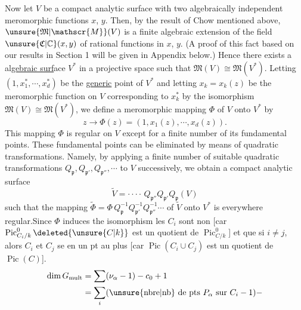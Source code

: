 Now let $V$ be a compact analytic surface with two algebraically independent meromorphic functions $x$, $y$. Then, by the result of Chow mentioned above, $\unsure{\mathfrak{M}|\mathscr{M}}(V)$ is a finite algebraic extension of the field $\unsure{\mathfrak{C}|\mathbb{C}}(x,y)$ of rational functions in $x$, $y$. (A proof of this fact based on our results in Section 1 will be given in Appendix below.) Hence there exists a  al\uline{gebraic surf}ace $V^{*}$ in a projective space such that $\mathfrak{M}(V)\cong\mathfrak{M}(V^{*})$. Letting $(1,x_{1}^{*},\cdots,x_{d}^{*})$ be the \uline{generic} point of $V^{*}$ and letting $x_{k}=x_{k}(z)$ be the meromorphic function on $V$ corresponding to $x_{k}^{*}$ by the isomorphism $\mathfrak{M}(V)\cong\mathfrak{M}(V^{*})$, we define a meromorphic mapping $\Phi$ of $V$ onto $V^{*}$ by
\[
z\longrightarrow\Phi(z)=(1,x_{1}(z),\cdots,x_{d}(z)).
\]
This mapping $\Phi$ is regular on $V$ except for a finite number of its fundamental points. These fundamental points can be eliminated by means of quadratic transformations. Namely, by applying a finite number of suitable quadratic transformations $Q_{\mathfrak{p}}, Q_{\mathfrak{p}'}, Q_{\mathfrak{p}''},\cdots$ to $V$ successively, we obtain a compact analytic surface
\[
\widetilde{V}=\cdot\cdot\cdot\cdot\, Q_{\mathfrak{p}''}Q_{\mathfrak{p}'}Q_{\mathfrak{p}}(V)
\]
such that the mapping $\widetilde{\Phi}=\Phi\,Q_{\mathfrak{p}}^{-1}Q_{\mathfrak{p}'}^{-1}Q_{\mathfrak{p}''}^{-1}\cdots$ of $\widetilde{V}$ onto $V^{*}$ is everywhere regular.\footnotemark[7] Since $\Phi$ induces the isomorphism
 les $C_i$ sont non  [car $\operatorname{Pic}^{0}_{C_i/k}\deleted{\unsure{C|k}}$ est un quotient de $\operatorname{Pic}^{0}_{C/k}$] et que   si $i\ne j$, alors $C_i$ et $C_j$ se  en un pt au plus [car $\operatorname{Pic}(C_i\cup C_j)$ est un quotient de $\operatorname{Pic}(C)$]. 
\[
\begin{aligned}
\dim G_{\mathrm{mult}}&=\sum(\nu_{\alpha}-1)-c_{0}+1\\
 &=\sum_{i}(\text{\unsure{nbre|nb} de pts }P_{\alpha}\text{ sur } C_i-1)-
\end{aligned}
\]
